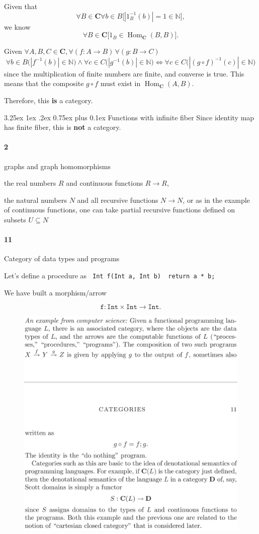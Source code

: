 \documentclass[12pt, letterpaper]{article}
\makeatletter
\renewcommand\subparagraph{\@startsection{subparagraph}{5}{\parindent}%
	{3.25ex \@plus1ex \@minus .2ex}%
	{0.75ex plus 0.1ex}%
	{\normalfont\normalsize\bfseries}}
\newcommand{\nat}{\mathbb{N}}
\newcommand{\Hom}{\operatorname{Hom}}
\newcommand{\bfC}{\mathbf{C}}
\newcommand{\red}[1]{{\color{red} #1}}
\newcommand{\card}[1]{\left\lvert #1 \right\rvert}
\theoremstyle{definition}
\theoremstyle{remark}
\theoremstyle{definition}
\theoremstyle{plain}
\numberwithin{equation}{section}
\makeatother
\begin{document}
	Given that
	\[ \forall B\in\bfC\forall b\in B \Big[\card{1_B^{-1}(b)}=1\in \nat\Big] , \]
	we know 
	\[ \forall B\in\bfC \Big[ 1_B\in\Hom_\bfC(B,B)\Big ]. \]
	
	Given $\forall A,B,C\in \bfC,\forall (f\colon A\to B) \,\forall (g\colon B\to C)$
	\[  \forall b\in B\Big(\card{f^{-1}(b)}\in\nat\Big) \land  \forall c\in C\Big(\card{g^{-1}(b)}\in\nat\Big) 
	\iff \forall c\in C \Big(\card{(g\circ f)^{-1}(c)}\in\nat\Big)
	\]
	since the multiplication of finite numbers are finite, and converse is true.
	This means that the composite $g\circ f$ must exist in $\Hom_\bfC(A,B)$.
	
	Therefore, this \textbf{is} a category.
	
	\subparagraph{Functions with infinite fiber}
	Since identity map has finite fiber, this is \textbf{not} a category.
	
	\paragraph{2}
	\begin{itemize}
		\red{
		\item graphs and graph homomorphisms
		\item the real numbers $R$ and continuous functions $R \to R$,
		\item the natural numbers $N$ and all recursive functions $N \to N$, or as in
		the example of continuous functions, one can take partial recursive
		functions defined on subsets $U \subseteq N$}
	\end{itemize}
	\paragraph{11}
	
	\red{Category of data types and programs}
	
	Let's define a procedure as
	\texttt{
		Int f(Int a, Int b) {
			return a * b;
		}
	}

	We have built a morphism/arrow
	
	\[\texttt{f}\colon \texttt{Int}\times \texttt{Int}\to \texttt{Int}.\]
	
	\begin{figure}[H]
		\centering
		\includegraphics[width=0.7\linewidth]{1.4_11}
		\caption{}
		\label{fig:1}
	\end{figure}
	
\end{document}
